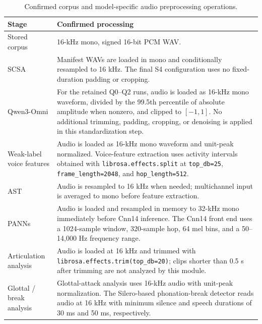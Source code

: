 \documentclass[10pt]{article}
\begin{document}
\begin{table}[h]
\centering
\caption{Confirmed corpus and model-specific audio preprocessing operations.}
\label{tab:audio_preprocessing}
\scriptsize
\begin{tabular}{p{}p{}}
\toprule
Stage & Confirmed processing \\
\midrule
Stored corpus &
16-kHz mono, signed 16-bit PCM WAV. \\

SCSA &
Manifest WAVs are loaded in mono and conditionally resampled to 16 kHz. The final S4 configuration uses no fixed-duration padding or cropping. \\

Qwen3-Omni &
For the retained Q0--Q2 runs, audio is loaded as 16-kHz mono waveform, divided by the 99.5th percentile of absolute amplitude when nonzero, and clipped to $[-1,1]$. No additional trimming, padding, cropping, or denoising is applied in this standardization step. \\

Weak-label voice features &
Audio is loaded as 16-kHz mono waveform and unit-peak normalized. Voice-feature extraction uses activity intervals obtained with \texttt{librosa.effects.split} at \texttt{top\_db=25}, \texttt{frame\_length=2048}, and \texttt{hop\_length=512}. \\

AST &
Audio is resampled to 16 kHz when needed; multichannel input is averaged to mono before feature extraction. \\

PANNs &
Audio is loaded and resampled in memory to 32-kHz mono immediately before Cnn14 inference. The Cnn14 front end uses a 1024-sample window, 320-sample hop, 64 mel bins, and a 50--14,000 Hz frequency range. \\

Articulation analysis &
Audio is loaded at 16 kHz and trimmed with \texttt{librosa.effects.trim(top\_db=20)}; clips shorter than 0.5 s after trimming are not analyzed by this module. \\

Glottal / break analysis &
Glottal-attack analysis uses 16-kHz audio with unit-peak normalization. The Silero-based phonation-break detector reads audio at 16 kHz with minimum silence and speech durations of 30 ms and 50 ms, respectively. \\
\bottomrule
\end{tabular}
\end{table}
\end{document}
